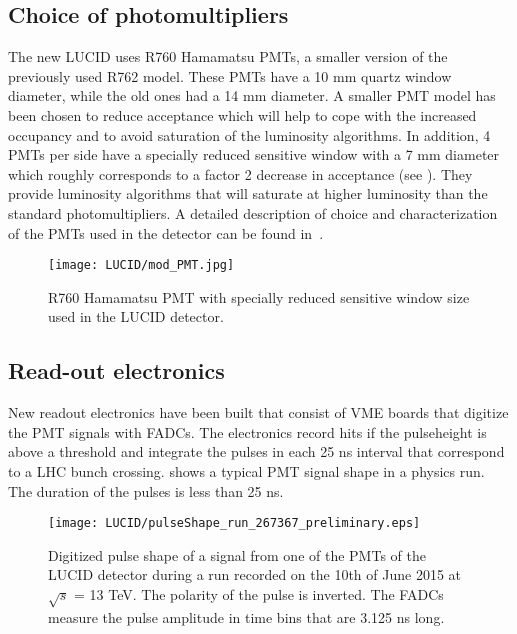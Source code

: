 \subsection{Choice of photomultipliers}
\label{subsec:PMTChoice}


The new LUCID uses R760 Hamamatsu PMTs, a smaller version of the previously used R762 model. These PMTs have a 
10 mm quartz window diameter, while the old ones had a 14 mm diameter. A smaller PMT model has been chosen to reduce acceptance 
which will help to cope with the increased occupancy and to avoid saturation of the luminosity algorithms.
In addition, 4 PMTs per side have a specially reduced sensitive window with a 7 mm diameter which roughly 
corresponds to a factor 2 decrease in acceptance (see ). They provide luminosity algorithms that will saturate at 
higher luminosity than the standard photomultipliers. A detailed description of choice and characterization of the PMTs used in the detector can be found in~\cite{Alberghi:2016tad}.


\begin{figure}
\centering
\texttt{[image: LUCID/mod\_PMT.jpg]}
\caption{R760 Hamamatsu PMT with specially reduced sensitive window size used in the LUCID detector.}
\label{fig:modPMT}
\end{figure}

\subsection{Read-out electronics}
\label{subsec:LUCIDElectronics}

New readout electronics have been built that consist of VME boards that digitize the PMT signals with FADCs. 
The electronics record hits if the pulseheight is above a threshold and integrate the pulses in each 25 ns 
interval that correspond to a LHC bunch crossing.  shows a typical PMT signal shape in 
a physics run. The duration of the pulses is less than 25 ns.

\begin{figure}
\centering
\texttt{[image: LUCID/pulseShape\_run\_267367\_preliminary.eps]}
\caption{Digitized pulse shape of a signal from one of the PMTs of the LUCID detector during a run recorded on 
the 10th of June 2015 at $\sqrt{s}$ = 13 TeV. The polarity of the pulse is inverted. The FADCs measure the 
pulse amplitude in time bins that are 3.125 ns long.}
\label{fig:pulseShape}
\end{figure}

